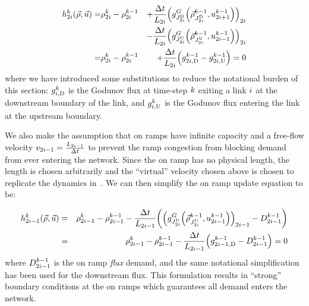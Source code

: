 \begin{eqnarray}
\syseq_{2\link}^{\tind}(\state,\control)= & \discrete{2\link}{\tind}-\discrete{2\link}{\tind-1} & +\dfrac{\Delta t}{\length_{2\link}}\left(\god_{\jdown{2\link}}\left(\juncstate{\jdown{2\link}}{\tind-1},\ramp_{2\link+1}^{\tind-1}\right)\right)_{2\link}\label{eq:rho-update}\\
&  & -\dfrac{\Delta t}{\length_{2\link}}\left(\god_{\jup{2\link}}\left(\juncstate{\jup{2\link}}{\tind-1},\ramp_{2\link-1}^{\tind-1}\right)\right)_{2\link}\nonumber \\
= & \discrete{2\link}{\tind}-\discrete{2\link}{\tind-1} & +\frac{\Delta t}{\length_{2\link}}\left(\fout{2\link}{\tind-1}-\fin{2\link}{\tind-1}\right)=0
\end{eqnarray}
where we have introduced some substitutions to reduce the notational
burden of this section: $g_{i,\text{D}}^{k}$ is the Godunov flux
at time-step $k$ exiting a link $i$ at the downstream boundary
of the link, and $g_{i,\text{U}}^{k}$ is the Godunov flux entering
the link at the upstream boundary.

We also make the assumption that on ramps have infinite capacity and
a free-flow velocity $v_{2i-1}=\frac{L_{2i-1}}{\Delta t}$
to prevent the ramp congestion from blocking demand from ever entering
the network. Since the on ramp has no physical length, the length
is chosen arbitrarily and the ``virtual'' velocity chosen above
is chosen to replicate the dynamics in~\cite{delle2014pde}. We can
then simplify the on ramp update equation to be:

\begin{eqnarray}
\syseq_{2\link-1}^{\tind}(\state,\control) & = & \discrete{2\link-1}{\tind}-\discrete{2\link-1}{\tind-1}-\frac{\Delta t}{\length_{2\link-1}}\left(\left(\god_{\jup{2\link}}\left(\juncstate{\jup{2\link}}{\tind-1},\ramp_{2\link-1}^{\tind-1}\right)\right)_{2\link-1}-\boundaryDemand{2\link-1}{\tind-1}\right)\label{eq:on ramp-update}\\
& = & \discrete{2\link-1}{\tind}-\discrete{2\link-1}{\tind-1}-\frac{\Delta t}{\length_{2\link-1}}\left(\fout{2\link-1}{\tind-1}-\boundaryDemand{2\link-1}{\tind-1}\right)=0
\end{eqnarray}
where $D_{2i-1}^{k-1}$ is the on ramp \emph{flux
}demand, and the same notational simplification has been used for
the downstream flux. This formulation results in ``strong'' boundary
conditions at the on ramps which guarantees all demand enters the network.

